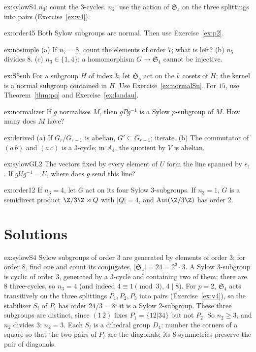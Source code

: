 \begin{hint}{ex:sylowS4}
$n_3$: count the $3$-cycles. $n_2$: use the action of $\mathfrak S_4$ on the three splittings into pairs (Exercise~\ref{ex:v4}).
\end{hint}
\begin{hint}{ex:order45}
Both Sylow subgroups are normal. Then use Exercise~\ref{ex:p2}.
\end{hint}
\begin{hint}{ex:nosimple}
(a) If $n_7=8$, count the elements of order $7$; what is left? (b) $n_5$ divides $8$. (c) $n_3\in\{1,4\}$; a homomorphism $G\to\mathfrak S_4$ cannot be injective.
\end{hint}
\begin{hint}{ex:S5sub}
For a subgroup $H$ of index $k$, let $\mathfrak S_5$ act on the $k$ cosets of $H$; the kernel is a normal subgroup contained in $H$. Use Exercise~\ref{ex:normalSn}. For $15$, use Theorem~\ref{thm:pq} and Exercise~\ref{ex:landau}.
\end{hint}
\begin{hint}{ex:normalizer}
If $g$ normalises $M$, then $gPg^{-1}$ is a Sylow $p$-subgroup of $M$. How many does $M$ have?
\end{hint}
\begin{hint}{ex:derived}
(a) If $G_r/G_{r-1}$ is abelian, $G'\subseteq G_{r-1}$; iterate. (b) The commutator of $(a\,b)$ and $(a\,c)$ is a $3$-cycle; in $A_4$, the quotient by $V$ is abelian.
\end{hint}
\begin{hint}{ex:sylowGL2}
The vectors fixed by every element of $U$ form the line spanned by $e_1$. If $gUg^{-1}=U$, where does $g$ send this line?
\end{hint}
\begin{hint}{ex:order12}
If $n_3=4$, let $G$ act on its four Sylow $3$-subgroups. If $n_3=1$, $G$ is a semidirect product $\Z/3\Z\rtimes Q$ with $|Q|=4$, and $\operatorname{Aut}(\Z/3\Z)$ has order $2$.
\end{hint}

\section{Solutions}

\begin{solution}{ex:sylowS4}
\idea Sylow subgroups of order $3$ are generated by elements of order $3$; for order $8$, find one and count its conjugates.
\writeup $|\mathfrak S_4|=24=2^3\cdot3$. A Sylow $3$-subgroup is cyclic of order $3$, generated by a $3$-cycle and containing two of them; there are $8$ three-cycles, so $n_3=4$ (and indeed $4\equiv1\pmod3$, $4\mid8$). For $p=2$, $\mathfrak S_4$ acts transitively on the three splittings $P_1,P_2,P_3$ into pairs (Exercise~\ref{ex:v4}), so the stabiliser $S_i$ of $P_i$ has order $24/3=8$: it is a Sylow $2$-subgroup. These three subgroups are distinct, since $(1\,2)$ fixes $P_1=\{12|34\}$ but not $P_2$. So $n_2\ge3$, and $n_2$ divides $3$: $n_2=3$. Each $S_i$ is a dihedral group $D_4$: number the corners of a square so that the two pairs of $P_i$ are the diagonals; its $8$ symmetries preserve the pair of diagonals.
\end{solution}

